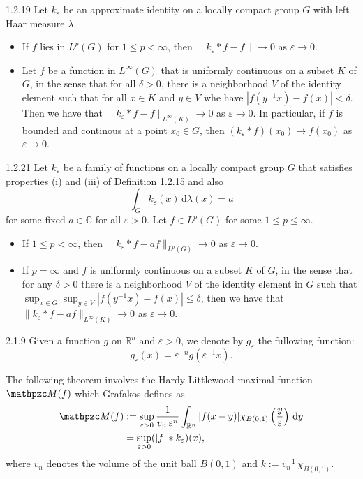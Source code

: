 \documentclass[../dissertation.tex]{subfiles}
\begin{document}
\begin{mthm}{1.2.19}
	Let $k_\varepsilon$ be an approximate identity on a locally compact group $G$
	with left Haar measure $\lambda$.
	\begin{itemize}
		\item[(1)] If $f$ lies in $L^p(G)$ for $1\leq p < \infty$, then 
			$\|k_\varepsilon*f-f\|\to 0$ as $\varepsilon \to 0$. 
		\item[(2)] Let $f$ be a function in $L^\infty(G)$ that is uniformly 
			continuous on a subset $K$ of $G$, in the sense that for all $\delta>0$,
			there is a neighborhood $V$ of the identity element such that for all
			$x \in K$ and $y \in V$ whe have $|f(y^{-1}x)-f(x)| < \delta$. Then 
			we have that $\|k_\varepsilon*f- f\|_{L^\infty(K)} \to 0$ as 
			$\varepsilon \to 0$. In particular, if $f$ is bounded and continous
			at a point $x_0\in G$, then $(k_\varepsilon * f)(x_0) \to f(x_0)$ 
			as $\varepsilon \to 0$. 
	\end{itemize}
\end{mthm}


\begin{mthm}{1.2.21}
	Let $k_\varepsilon$ be a family of functions on a locally compact group $G$ 
	that satisfies properties (i) and (iii) of Definition 1.2.15 and also
	\[
		\int_G k_\varepsilon (x) \, \mathrm{d}\lambda(x) = a
	\]
	for some fixed $a \in \mathbb C$ for all $\varepsilon >0$. Let $f\in L^p(G)$
	for some $1\leq p \leq \infty$.
	\begin{itemize}
		\item[(a)] If $1 \leq p < \infty$, then $\| k_\varepsilon * f - a f\|_{L^p(G)} \to 0$
			as $\varepsilon \to 0$.
		\item[(b)] If $p = \infty$ and $f$ is uniformly continuous on a subset $K$ of $G$, in 
			the sense that for any $\delta>0$ there is a neighborhood $V$ of the identity 
			element in $G$ such that $\sup_{x\in G} \sup_{y\in V} |f(y^{-1} x)- f(x)| \leq \delta$,
			then we have that $\|k_\varepsilon * f - a f\|_{L^\infty(K)} \to 0$ as
			$\varepsilon \to 0$.
	\end{itemize}
\end{mthm}


\begin{mdefn}{2.1.9}
	Given a function $g$ on $\mathbb R^n$ and $\varepsilon >0$, we denote by 
	$g_\varepsilon$ the fullowing function:
	\[
		g_\varepsilon(x) = \varepsilon^{-n} g(\varepsilon^{-1}x).
	\]
\end{mdefn}

The following theorem involves the Hardy-Littlewood maximal function
$\mathpzc M(f)$ which Grafakos defines as
\begin{align*}
	\mathpzc M(f) 
		&:= \sup_{\varepsilon > 0} \frac{1}{v_n \, \varepsilon^n} 
			\int_{\mathbb R^n}
				|f(x-y)| \chi_{B(0,1)} \left(\dfrac{y}{\varepsilon}\right) 
			\, \mathrm{d}y \\
		&= \sup_{\varepsilon > 0} (|f| * k_\varepsilon)(x),
\end{align*}
where $v_n$ denotes the volume of the unit ball $B(0,1)$ and $k:=v_n^{-1} \, \chi_{B(0,1)}$.
\end{document}

